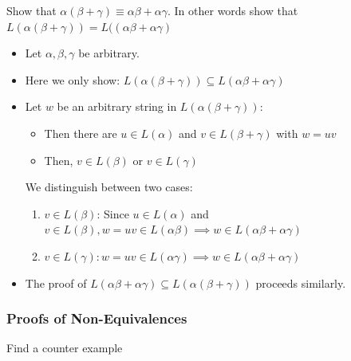 \documentclass[a3paper, 8pt]{extarticle}
\begin{document}
\begin{multicols*}{6}
        Show that $\alpha(\beta+\gamma) \equiv \alpha \beta + \alpha \gamma$. In other words show that $L(\alpha(\beta+\gamma))=L((\alpha \beta + \alpha \gamma)$
        \begin{itemize}
            \item Let $\alpha, \beta, \gamma$ be arbitrary.
            \item Here we only show: $L(\alpha(\beta + \gamma)) \subseteq L(\alpha \beta + \alpha \gamma)$
            \item Let $w$ be an arbitrary string in $L(\alpha(\beta+\gamma)):$
            \begin{itemize}
                \item Then there are $u \in L(\alpha)$ and $v \in L(\beta + \gamma)$ with $w = uv$
                \item Then, $v \in L(\beta)$ or $v \in L(\gamma)$
            \end{itemize}
            We distinguish between two cases:
                \begin{enumerate}
                    \item $v \in L(\beta)$: Since $u \in L(\alpha)$ and $v \in L(\beta), w = uv \in L(\alpha \beta) \implies w \in L(\alpha \beta + \alpha \gamma)$
                    \item $v \in L(\gamma): w = uv \in L(\alpha \gamma) \implies w \in L(\alpha \beta + \alpha \gamma)$
                \end{enumerate} 
            \item The proof of $L(\alpha \beta + \alpha \gamma) \subseteq L(\alpha(\beta+ \gamma))$ proceeds similarly.
        \end{itemize}
    
\subsubsection{Proofs of Non-Equivalences} 
    Find a counter example
 
    
    

\end{multicols*}
\end{document}
